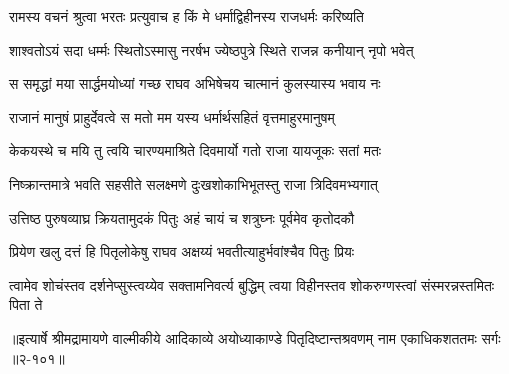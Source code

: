 
\twolineshloka
{रामस्य वचनं श्रुत्वा भरतः प्रत्युवाच ह}
{किं मे धर्माद्विहीनस्य राजधर्मः करिष्यति} %

\twolineshloka
{शाश्वतोऽयं सदा धर्म्मः स्थितोऽस्मासु नरर्षभ}
{ज्येष्ठपुत्रे स्थिते राजन्न कनीयान् नृपो भवेत्} %

\twolineshloka
{स समृद्धां मया सार्द्धमयोध्यां गच्छ राघव}
{अभिषेचय चात्मानं कुलस्यास्य भवाय नः} %

\twolineshloka
{राजानं मानुषं प्राहुर्देवत्वे स मतो मम}
{यस्य धर्मार्थसहितं वृत्तमाहुरमानुषम्} %

\twolineshloka
{केकयस्थे च मयि तु त्वयि चारण्यमाश्रिते}
{दिवमार्यो गतो राजा यायजूकः सतां मतः} %

\twolineshloka
{निष्क्रान्तमात्रे भवति सहसीते सलक्ष्मणे}
{दुःखशोकाभिभूतस्तु राजा त्रिदिवमभ्यगात्} %

\twolineshloka
{उत्तिष्ठ पुरुषव्याघ्र क्रियतामुदकं पितुः}
{अहं चायं च शत्रुघ्नः पूर्वमेव कृतोदकौ} %

\twolineshloka
{प्रियेण खलु दत्तं हि पितृलोकेषु राघव}
{अक्षय्यं भवतीत्याहुर्भवांश्चैव पितुः प्रियः} %

\twolineshloka
{त्वामेव शोचंस्तव दर्शनेप्सुस्त्वय्येव सक्तामनिवर्त्य बुद्धिम्}
{त्वया विहीनस्तव शोकरुग्णस्त्वां संस्मरन्नस्तमितः पिता ते} %


॥इत्यार्षे श्रीमद्रामायणे वाल्मीकीये आदिकाव्ये अयोध्याकाण्डे पितृदिष्टान्तश्रवणम् नाम एकाधिकशततमः सर्गः ॥२-१०१॥
